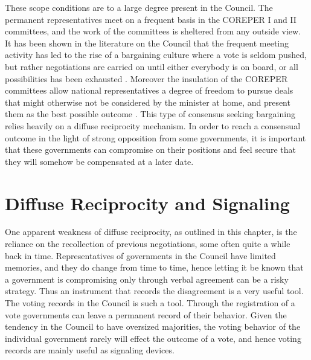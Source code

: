 These scope conditions are to a large degree present in the Council. The permanent representatives meet on a frequent basis in the COREPER I and II committees, and the work of the committees is sheltered from any outside view. It has been shown in the literature on the Council that the frequent meeting activity has led to the rise of a bargaining culture where a vote is seldom pushed, but rather negotiations are carried on until either everybody is on board, or all possibilities has been exhausted \citep{Lewis1998,Lewis2003, BjurulfElgstrom2004}. Moreover the insulation of the COREPER committees allow national representatives  a degree of freedom to pursue deals that might otherwise not be considered by the minister at home, and present them as the best possible outcome \citep[947]{Lewis2005}. This type of consensus seeking bargaining relies heavily on a diffuse reciprocity mechanism. In order to reach a consensual outcome in the light of strong opposition from some governments, it is important that these governments can compromise on their positions and feel secure that they will somehow be compensated at a later date. 


\section{Diffuse Reciprocity and Signaling}

One apparent weakness of diffuse reciprocity, as outlined in this chapter, is the reliance on the recollection of previous negotiations, some often quite a while back in time. Representatives of governments in the Council have limited memories, and they do change from time to time, hence letting it be known that a government is compromising only through verbal agreement can be a risky strategy. Thus an instrument that records the disagreement is a very useful tool. The voting records in the Council is such a tool. Through the registration of a vote governments can leave a permanent record of their behavior. Given the tendency in the Council to have oversized majorities, the voting behavior of the individual government rarely will effect the outcome of a vote, and hence voting records are mainly useful as signaling devices.

